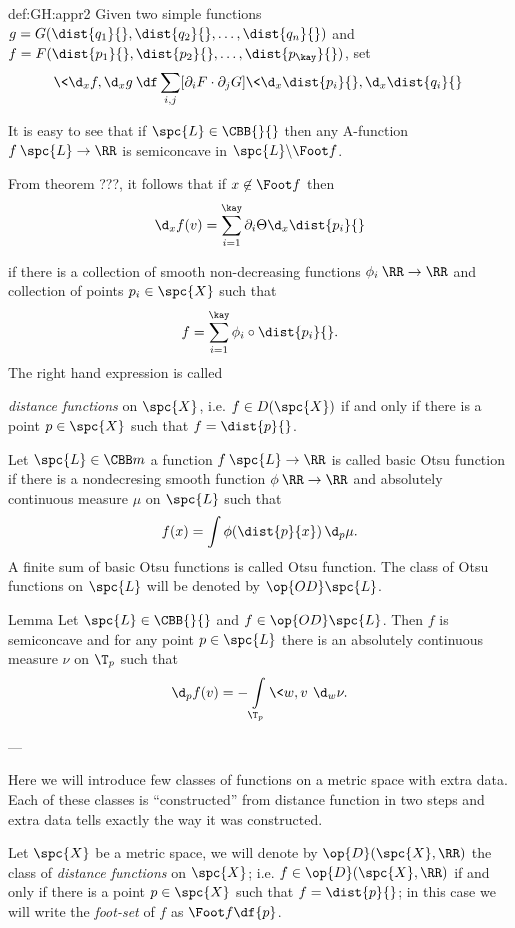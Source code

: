 {\begin{subthm}{def:GH:appr2}
Given two simple functions $g=G(\dist{q_1}{},\dist{q_2}{},\dots,\dist{q_n}{})$ and $f=F(\dist{p_1}{},\dist{p_2}{},\dots,\dist{p_\kay}{})$,
 set
$$\<\d_x f,\d_x g\>
\df
\sum_{i,j}[\partial_iF\cdot\partial_jG]\<\d_x \dist{p_i}{},\d_x\dist{q_i}{}\>$$

It is easy to see that if $\spc{L}\in\CBB{}{}$ then any A-function $f\:\spc{L}\to\RR$ is semiconcave in $\spc{L}\backslash \Foot f$.

From theorem ???,
it follows that if $x\not\in \Foot f$ then 
$$\d_x f(v)=\sum_{i=1}^\kay \partial_i\Theta\d_x\dist{p_i}{}$$




 if there is a collection of smooth non-decreasing functions $\phi_i\:\RR\to\RR$ and collection of points $p_i\in\spc{X}$
such that
$$f=\sum_{i=1}^\kay\phi_i\circ\dist{p_i}{}.$$
The right hand expression is called 


\emph{distance functions} on $\spc{X}$, i.e. $f\in D(\spc{X})$ if and only if there is a point $p\in \spc{X}$ such that $f=\dist{p}{}$.

Let $\spc{L}\in\CBB m{}$ a function $f\:\spc{L}\to \RR$ is called basic Otsu function if there is a nondecresing smooth function $\phi\:\RR\to\RR$ and absolutely continuous measure $\mu$ on $\spc{L}$ such that
$$f(x)=\int\phi(\dist{p}{x})\,\d_p\mu.$$
A finite sum of basic Otsu functions is called Otsu function.
The class of Otsu functions on $\spc{L}$ will be denoted by $\op{OD}\spc{L}$.

\begin{thm}{Lemma}
Let $\spc{L}\in\CBB{}{}$ and $f\in \op{OD}\spc{L}$.
Then $f$ is semiconcave and for any point $p\in \spc{L}$ there is an absolutely continuous measure $\nu$ on $\T_p$ such that $$\d_pf(v)=-\int\limits_{\T_p}\<w,v\>\,\d_w\nu.$$
\end{thm}




---

Here we will introduce few classes of functions on a metric space with extra data.
Each of these classes is ``constructed'' from distance function in two steps and extra data tells exactly the way it was constructed.

Let $\spc{X}$ be a metric space, we will denote by $\op{D}(\spc{X},\RR)$ 
the class of \emph{distance functions} on $\spc{X}$;
i.e. $f\in \op{D}(\spc{X},\RR)$ 
if and only if there is a point $p\in \spc{X}$ such that $f=\dist{p}{}$;
in this case we will write the \emph{foot-set} of $f$ as $\Foot f\df\{p\}$.


\end{subthm}}
